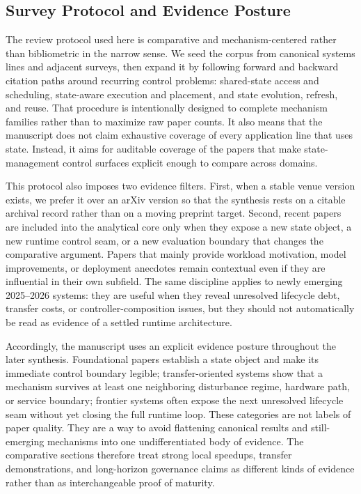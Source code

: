 \documentclass[acmsmall,screen,review]{acmart}
\begin{document}
\subsection{Survey Protocol and Evidence Posture}

The review protocol used here is comparative and mechanism-centered rather than bibliometric in the narrow sense. We seed the corpus from canonical systems lines and adjacent surveys, then expand it by following forward and backward citation paths around recurring control problems: shared-state access and scheduling, state-aware execution and placement, and state evolution, refresh, and reuse. That procedure is intentionally designed to complete mechanism families rather than to maximize raw paper counts. It also means that the manuscript does not claim exhaustive coverage of every application line that uses state. Instead, it aims for auditable coverage of the papers that make state-management control surfaces explicit enough to compare across domains.

This protocol also imposes two evidence filters. First, when a stable venue version exists, we prefer it over an arXiv version so that the synthesis rests on a citable archival record rather than on a moving preprint target. Second, recent papers are included into the analytical core only when they expose a new state object, a new runtime control seam, or a new evaluation boundary that changes the comparative argument. Papers that mainly provide workload motivation, model improvements, or deployment anecdotes remain contextual even if they are influential in their own subfield. The same discipline applies to newly emerging 2025--2026 systems: they are useful when they reveal unresolved lifecycle debt, transfer costs, or controller-composition issues, but they should not automatically be read as evidence of a settled runtime architecture.

Accordingly, the manuscript uses an explicit evidence posture throughout the later synthesis. Foundational papers establish a state object and make its immediate control boundary legible; transfer-oriented systems show that a mechanism survives at least one neighboring disturbance regime, hardware path, or service boundary; frontier systems often expose the next unresolved lifecycle seam without yet closing the full runtime loop. These categories are not labels of paper quality. They are a way to avoid flattening canonical results and still-emerging mechanisms into one undifferentiated body of evidence. The comparative sections therefore treat strong local speedups, transfer demonstrations, and long-horizon governance claims as different kinds of evidence rather than as interchangeable proof of maturity.
\end{document}
